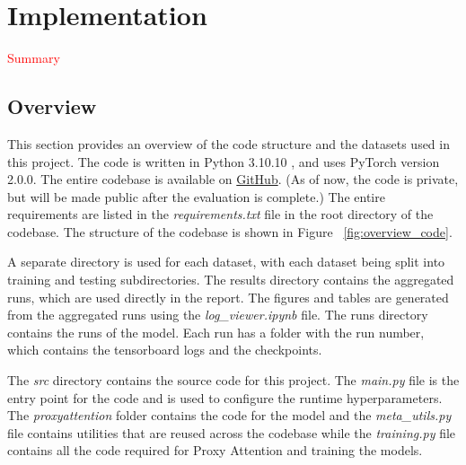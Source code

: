 \chapter{Implementation} \label{ch:implementation}
\textcolor{red}{Summary}
\section{Overview}
This section provides an overview of the code structure and the datasets used in this project. The code is written in Python 3.10.10 , and uses PyTorch version 2.0.0. The entire codebase is available on \href{https://github.com/SubhadityaMukherjee/proxy_attention}{GitHub}. (As of now, the code is private, but will be made public after the evaluation is complete.) The entire requirements are listed in the \textit{requirements.txt} file in the root directory of the codebase. The structure of the codebase is shown in Figure ~\ref{fig:overview_code}.

A separate directory is used for each dataset, with each dataset being split into training and testing subdirectories. The results directory contains the aggregated runs, which are used directly in the report. The figures and tables are generated from the aggregated runs using the \textit{log\_viewer.ipynb} file. The runs directory contains the runs of the model. Each run has a folder with the run number, which contains the tensorboard logs and the checkpoints. 

The \textit{src} directory contains the source code for this project. The \textit{main.py} file is the entry point for the code and is used to configure the runtime hyperparameters. The \textit{proxyattention} folder contains the code for the model and the \textit{meta\_utils.py} file contains utilities that are reused across the codebase while the \textit{training.py} file contains all the code required for Proxy Attention and training the models.


